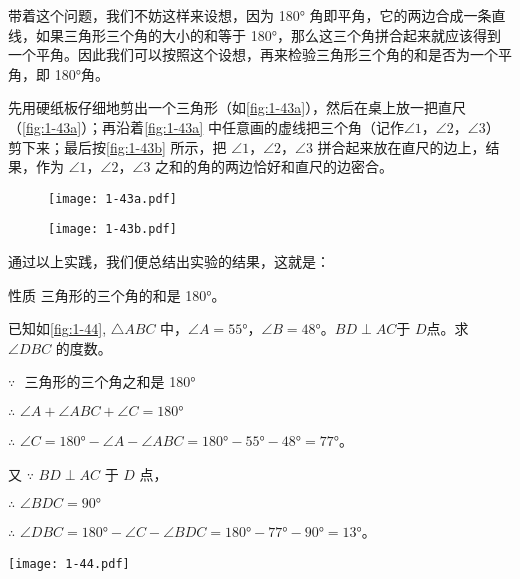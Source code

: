 带着这个问题，我们不妨这样来设想，因为 \ang{180} 角即平角，它的两边合成一条直线，如果三角形三个角的大小的和等于 \ang{180}，那么这三个角拼合起来就应该得到一个平角。因此我们可以按照这个设想，再来检验三角形三个角的和是否为一个平角，即 \ang{180}角。

先用硬纸板仔细地剪出一个三角形（如\cref{fig:1-43a}），然后在桌上放一把直尺（\cref{fig:1-43a}）；再沿着\cref{fig:1-43a} 中任意画的虚线把三个角（记作$\angle 1$，$\angle 2$，$\angle 3$）剪下来；最后按\cref{fig:1-43b} 所示，把 $\angle 1$，$\angle 2$，$\angle 3$ 拼合起来放在直尺的边上，结果，作为 $\angle 1$，$\angle 2$，$\angle 3$ 之和的角的两边恰好和直尺的边密合。

\begin{figure}
	\begin{minipage}[b]{0.45\linewidth}\centering
    \texttt{[image: 1-43a.pdf]}
		\subcaption{}\label{fig:1-43a}
	\end{minipage}
	\begin{minipage}[b]{0.45\linewidth}\centering
    \texttt{[image: 1-43b.pdf]}
		\subcaption{}\label{fig:1-43b}
	\end{minipage}
	\caption{}\label{fig:1-43}
\end{figure}

通过以上实践，我们便总结出实验的结果，这就是：

\begin{Theorem}{性质}
三角形的三个角的和是 \ang{180}。	
\end{Theorem}

\begin{example}
已知如\cref{fig:1-44}, $\triangle ABC$ 中，$\angle A=\ang{55}$，$\angle B=\ang{48}$。$BD\perp AC$于 $D $点。求 $\angle DBC$ 的度数。
\end{example}
\par\medskip\noindent
\begin{minipage}{0.7\linewidth}
	\begin{solution}
		$\because\,\,$ 三角形的三个角之和是 \ang{180}
		
		$\therefore\,\, \angle A+\angle ABC+\angle C=\ang{180}$
		
		$\therefore\,\, \angle C=\ang{180}-\angle A-\angle ABC
		=\ang{180}-\ang{55}-\ang{48}=\ang{77}$。
		
		又 $\because\,\, BD\perp AC$ 于 $D$ 点，
		
		$\therefore\,\, \angle BDC=\ang{90} $
		
		$\therefore\,\, \angle DBC=\ang{180}-\angle C-\angle BDC
		=\ang{180}-\ang{77}-\ang{90}=\ang{13}$。
	\end{solution}
\end{minipage}%
\begin{minipage}{0.3\linewidth}\centering
  \begin{figurehere}
		\texttt{[image: 1-44.pdf]}
		\caption{}\label{fig:1-44}
	\end{figurehere}
\end{minipage}

